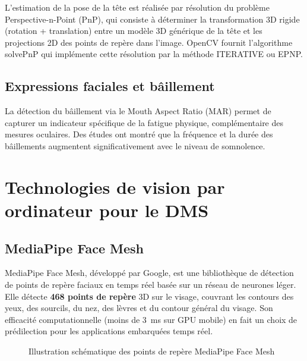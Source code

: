 \documentclass[12pt,a4paper]{report}
\begin{document}
L'estimation de la pose de la t\^ete est r\'ealis\'ee par r\'esolution du probl\`eme Perspective-n-Point (PnP), qui consiste \`a d\'eterminer la transformation 3D rigide (rotation + translation) entre un mod\`ele 3D g\'en\'erique de la t\^ete et les projections 2D des points de rep\`ere dans l'image. OpenCV fournit l'algorithme solvePnP qui impl\'emente cette r\'esolution par la m\'ethode ITERATIVE ou EPNP.

\subsection{Expressions faciales et b\^aillement}

La d\'etection du b\^aillement via le Mouth Aspect Ratio (MAR) permet de capturer un indicateur sp\'ecifique de la fatigue physique, compl\'ementaire des mesures oculaires. Des \'etudes ont montr\'e que la fr\'equence et la dur\'ee des b\^aillements augmentent significativement avec le niveau de somnolence.

\section{Technologies de vision par ordinateur pour le DMS}

\subsection{MediaPipe Face Mesh}

MediaPipe Face Mesh, d\'evelopp\'e par Google, est une biblioth\`eque de d\'etection de points de rep\`ere faciaux en temps r\'eel bas\'ee sur un r\'eseau de neurones l\'eger. Elle d\'etecte \textbf{468 points de rep\`ere} 3D sur le visage, couvrant les contours des yeux, des sourcils, du nez, des l\`evres et du contour g\'en\'eral du visage. Son efficacit\'e computationnelle (moins de 3~ms sur GPU mobile) en fait un choix de pr\'edilection pour les applications embarqu\'ees temps r\'eel.

\begin{figure}[H]
\centering
{}
\caption{Illustration sch\'ematique des points de rep\`ere MediaPipe Face Mesh}
\label{fig:mediapipe}
\end{figure}
\end{document}

